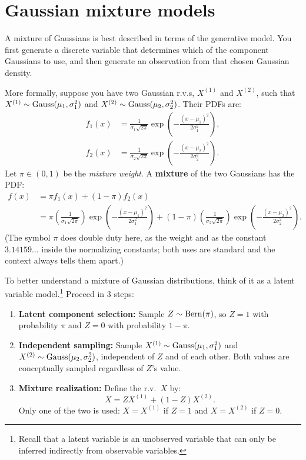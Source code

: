 \section{Gaussian mixture models}
\label{sec:models-gmm}

A mixture of Gaussians is best described in terms of the generative model.
You first generate a discrete variable that determines which of the component Gaussians to use, and then generate an observation from that chosen Gaussian density.

More formally, suppose you have two Gaussian r.v.s, $X^{(1)}$ and $X^{(2)}$, such that $X^{(1)} \sim \text{Gauss}(\mu_1, \sigma^2_1)$ and $X^{(2)} \sim \text{Gauss}(\mu_2, \sigma^2_2)$.
Their PDFs are:
\begin{align*}
f_1(x) &= \frac{1}{\sigma_1 \sqrt{2 \pi}} \exp \left( - \frac{(x-\mu_1)^2}{2 \sigma_1^2} \right), \\
f_2(x) &= \frac{1}{\sigma_2 \sqrt{2 \pi}} \exp \left( - \frac{(x-\mu_2)^2}{2 \sigma_2^2} \right).
\end{align*}
Let $\pi \in (0, 1)$ be the \textit{mixture weight}.
A \textbf{mixture} of the two Gaussians has the PDF:
\begin{align*}
f(x) &= \pi f_1(x) + (1 - \pi) f_2(x) \\
	&= \pi \left( \frac{1}{\sigma_1 \sqrt{2 \pi}} \right) \exp \left( - \frac{(x-\mu_1)^2}{2 \sigma_1^2} \right)  + (1-\pi) \left( \frac{1}{\sigma_2 \sqrt{2 \pi}} \right) \exp \left( - \frac{(x-\mu_2)^2}{2 \sigma_2^2} \right).
\end{align*}
(The symbol $\pi$ does double duty here, as the weight and as the constant $3.14159\ldots$ inside the normalizing constants; both uses are standard and the context always tells them apart.)

To better understand a mixture of Gaussian distributions, think of it as a latent variable model.\footnote{Recall that a latent variable is an unobserved variable that can only be inferred indirectly from observable variables.}
Proceed in 3 steps:
\begin{enumerate}
\item \textbf{Latent component selection:} Sample $Z \sim \text{Bern}(\pi)$, so $Z = 1$ with probability $\pi$ and $Z = 0$ with probability $1 - \pi$.
\item \textbf{Independent sampling:} Sample $X^{(1)} \sim \text{Gauss}(\mu_1, \sigma_1^2)$ and $X^{(2)} \sim \text{Gauss}(\mu_2, \sigma_2^2)$, independent of $Z$ and of each other.
Both values are conceptually sampled regardless of $Z$'s value.
\item \textbf{Mixture realization:} Define the r.v.\ $X$ by:
\[
X = Z X^{(1)} + (1 - Z) X^{(2)}.
\]
Only one of the two is used: $X = X^{(1)}$ if $Z = 1$ and $X = X^{(2)}$ if $Z = 0$.
\end{enumerate}

